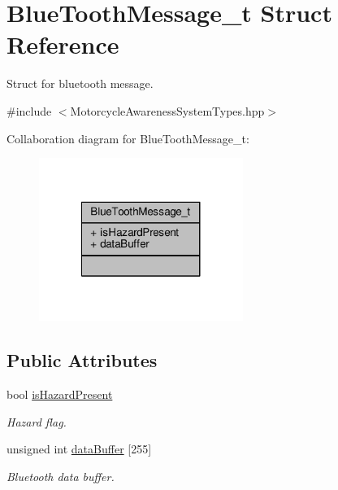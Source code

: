 \hypertarget{structBlueToothMessage__t}{\section{Blue\-Tooth\-Message\-\_\-t Struct Reference}
\label{structBlueToothMessage__t}
}


Struct for bluetooth message.  




{\ttfamily \#include $<$Motorcycle\-Awareness\-System\-Types.\-hpp$>$}



Collaboration diagram for Blue\-Tooth\-Message\-\_\-t\-:\nopagebreak
\begin{figure}[H]
\begin{center}
\leavevmode
\includegraphics[width=188pt]{structBlueToothMessage__t__coll__graph}
\end{center}
\end{figure}
\subsection*{Public Attributes}
\begin{DoxyCompactItemize}
\item 
bool \hyperlink{structBlueToothMessage__t_a2dd315aa1cba1d2d3045e26b9f171e61}{is\-Hazard\-Present}
\begin{DoxyCompactList}\small\item\em Hazard flag. \end{DoxyCompactList}\item 
unsigned int \hyperlink{structBlueToothMessage__t_ab872789a32f068dae8bcf77122256b78}{data\-Buffer} \mbox{[}255\mbox{]}
\begin{DoxyCompactList}\small\item\em Bluetooth data buffer. \end{DoxyCompactList}\end{DoxyCompactItemize}


